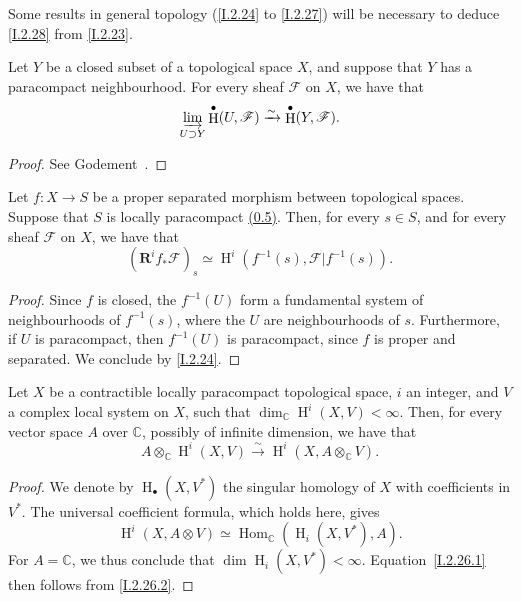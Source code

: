 \documentclass{report}
\theoremstyle{plain}
\newenvironment{corollary}[1]
    {\renewcommand\theinnercustomcorollary{#1}\innercustomcorollary}
    {\endinnercustomcorollary}
\theoremstyle{definition}
\newenvironment{reminder}[1]
    {\renewcommand\theinnercustomreminder{#1}\innercustomreminder}
    {\endinnercustomreminder}
\newcommand{\sh}[1]{{\mathscr{#1}}}
\newcommand{\CC}{\mathbb{C}}
\newcommand{\RR}{\mathbf{R}}
\DeclareMathOperator{\Hom}{Hom}
\DeclareMathOperator{\HH}{H}
\begin{document}
Some results in general topology (\cref{I.2.24} to \cref{I.2.27}) will be necessary to deduce \cref{I.2.28} from \cref{I.2.23}.

\begin{reminder}{2.24}
\label{I.2.24}
  Let $Y$ be a closed subset of a topological space $X$, and suppose that $Y$ has a paracompact neighbourhood.
  For every sheaf $\sh{F}$ on $X$, we have that
  \[
    \varinjlim_{U\supset Y} \HH^\bullet(U,\sh{F}) \xrightarrow{\sim} \HH^\bullet(Y,\sh{F}).
  \]
\end{reminder}

\begin{proof}
  See Godement~\cite[II, 4.11.1, p.~193]{7}.
\end{proof}

\begin{corollary}{2.25}
\label{I.2.25}
  Let $f\colon X\to S$ be a proper separated morphism between topological spaces.
  Suppose that $S$ is locally paracompact \hyperref[0.5]{(0.5)}.
  Then, for every $s\in S$, and for every sheaf $\sh{F}$ on $X$, we have that
  \[
    (\RR^i f_*\sh{F})_s \simeq \HH^i(f^{-1}(s), \sh{F}|f^{-1}(s)).
  \]
\end{corollary}

\begin{proof}
  Since $f$ is closed, the $f^{-1}(U)$ form a fundamental system of neighbourhoods of $f^{-1}(s)$, where the $U$ are neighbourhoods of $s$.
  Furthermore, if $U$ is paracompact, then $f^{-1}(U)$ is paracompact, since $f$ is proper and separated.
  We conclude by \cref{I.2.24}.
\end{proof}

\begin{reminder}{2.26}
\label{I.2.26}
  Let $X$ be a contractible locally paracompact topological space, $i$ an integer, and $V$ a complex local system on $X$, such that $\dim_\CC\HH^i(X,V)<\infty$.
  Then, for every vector space $A$ over $\CC$, possibly of infinite dimension, we have that
  \[
  \label{I.2.26.1}
    A\otimes_\CC\HH^i(X,V) \xrightarrow{\sim} \HH^i(X,A\otimes_\CC V).
  \tag{2.26.1}
  \]
\end{reminder}

\begin{proof}
  We denote by $\HH_\bullet(X,V^*)$ the singular homology of $X$ with coefficients in $V^*$.
  The universal coefficient formula, which holds here, gives
  \[
  \label{I.2.26.2}
    \HH^i(X,A\otimes V) \simeq \Hom_\CC(\HH_i(X,V^*),A).
  \tag{2.26.2}
  \]
  For $A=\CC$, we thus conclude that $\dim\HH_i(X,V^*)<\infty$.
  Equation~\cref{I.2.26.1} then follows from \cref{I.2.26.2}.
\end{proof}
\end{document}
